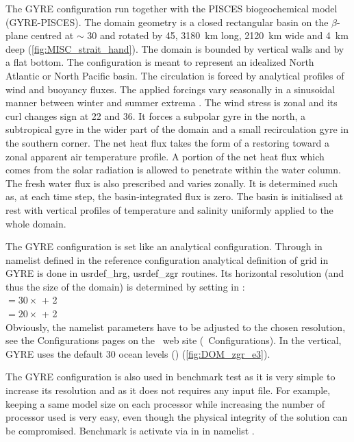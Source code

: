 \documentclass[../main/NEMO_manual]{subfiles}
\begin{document}
The GYRE configuration run together with the PISCES biogeochemical model (GYRE-PISCES).
The domain geometry is a closed rectangular basin on the $\beta$-plane centred at $\sim$ 30 and
rotated by 45\deg, 3180~km long, 2120~km wide and 4~km deep (\autoref{fig:MISC_strait_hand}).
The domain is bounded by vertical walls and by a flat bottom.
The configuration is meant to represent an idealized North Atlantic or North Pacific basin.
The circulation is forced by analytical profiles of wind and buoyancy fluxes.
The applied forcings vary seasonally in a sinusoidal manner between winter and summer extrema \citep{levy.klein.ea_OM10}.
The wind stress is zonal and its curl changes sign at 22 and 36.
It forces a subpolar gyre in the north, a subtropical gyre in the wider part of the domain and
a small recirculation gyre in the southern corner.
The net heat flux takes the form of a restoring toward a zonal apparent air temperature profile.
A portion of the net heat flux which comes from the solar radiation is allowed to penetrate within the water column.
The fresh water flux is also prescribed and varies zonally.
It is determined such as, at each time step, the basin-integrated flux is zero.
The basin is initialised at rest with vertical profiles of temperature and salinity uniformly applied to
the whole domain.

The GYRE configuration is set like an analytical configuration.
Through  in  namelist defined in
the reference configuration 
analytical definition of grid in GYRE is done in usrdef\_hrg, usrdef\_zgr routines.
Its horizontal resolution (and thus the size of the domain) is determined by
setting  in : \\

 $= 30 \times$  + 2   \\

 $= 20 \times$  + 2   \\

Obviously, the namelist parameters have to be adjusted to the chosen resolution,
see the Configurations pages on the \NEMO\ web site (\NEMO\ Configurations).
In the vertical, GYRE uses the default 30 ocean levels () (\autoref{fig:DOM_zgr_e3}).

The GYRE configuration is also used in benchmark test as it is very simple to increase its resolution and
as it does not requires any input file.
For example, keeping a same model size on each processor while increasing the number of processor used is very easy,
even though the physical integrity of the solution can be compromised.
Benchmark is activate via  in  in
namelist .
\end{document}
